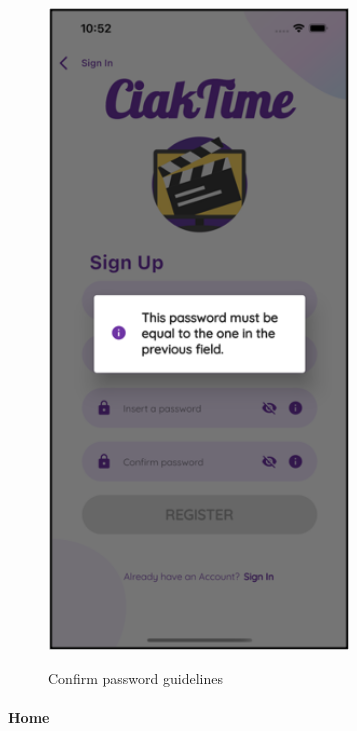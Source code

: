 \documentclass[12pt, a4paper]{article}
\numberwithin{figure}{section}
\begin{document}
\begin{center}
\begin{minipage}[t]{0.31\textwidth}
\begin{figure}[H]
			\includegraphics[width=0.71\textwidth]{images/final/infoConfirmPass.png}\\
			\caption{Confirm password guidelines}
		\end{figure}
	\end{minipage}
\end{center}

\paragraph{Home}
\end{document}
